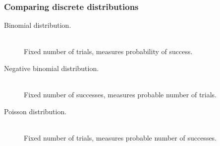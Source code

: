 \documentclass[t]{beamer}
\begin{document}
\begin{frame}
  \frametitle{Comparing discrete distributions}

  \begin{description}
  \item[Binomial distribution.] \hfill \\
    Fixed number of trials, measures probability of success.
  \item[Negative binomial distribution.] \hfill \\
    Fixed number of successes, measures probable number of trials.
  \item[Poisson distribution.] \hfill \\
    Fixed number of trials, measures probable number of successes.
  \end{description}

\end{frame}
\end{document}
